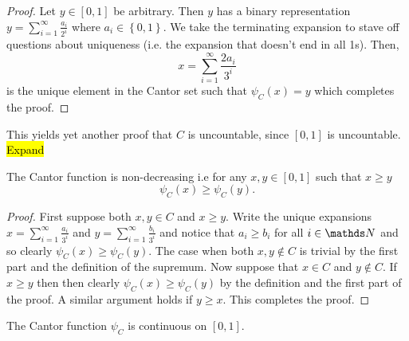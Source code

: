 \begin{proof}
Let $y\in\left[0,1\right]$ be arbitrary. Then $y$ has a binary representation
$y=\sum_{i=1}^{\infty}\frac{a_{i}}{2^{i}}$ where $a_{i}\in\left\{ 0,1\right\} $.
We take the terminating expansion to stave off questions about uniqueness
(i.e. the expansion that doesn't end in all 1s). Then, 
\[
x=\sum_{i=1}^{\infty}\frac{2a_{i}}{3^{i}}
\]
is the unique element in the Cantor set such that $\psi_{C}\left(x\right)=y$
which completes the proof.
\end{proof}
This yields yet another proof that $C$ is uncountable, since $\left[0,1\right]$
is uncountable. \hl{Expand}
\begin{prop}
\label{prop:cantorFunctionIncreasing}The Cantor function is non-decreasing
i.e for any $x,y\in\left[0,1\right]$ such that $x\geq y$
\[
\psi_{C}\left(x\right)\geq\psi_{C}\left(y\right).
\]
\end{prop}

\begin{proof}
First suppose both $x,y\in C$ and $x\geq y$. Write the unique expansions
$x=\sum_{i=1}^{\infty}\frac{a_{i}}{3^{i}}$ and $y=\sum_{i=1}^{\infty}\frac{b_{i}}{3^{i}}$
and notice that $a_{i}\geq b_{i}$ for all $i\in\N$ and so clearly
$\psi_{C}\left(x\right)\geq\psi_{C}\left(y\right)$. The case when
both $x,y\notin C$ is trivial by the first part and the definition
of the supremum. Now suppose that $x\in C$ and $y\notin C.$ If $x\geq y$
then then clearly $\psi_{C}\left(x\right)\geq\psi_{C}\left(y\right)$
by the definition and the first part of the proof. A similar argument
holds if $y\geq x$. This completes the proof.
\end{proof}
%
\begin{prop}
\label{prop:cantorFunctionContinuous}The Cantor function $\psi_{C}$
is continuous on $\left[0,1\right]$.
\end{prop}

